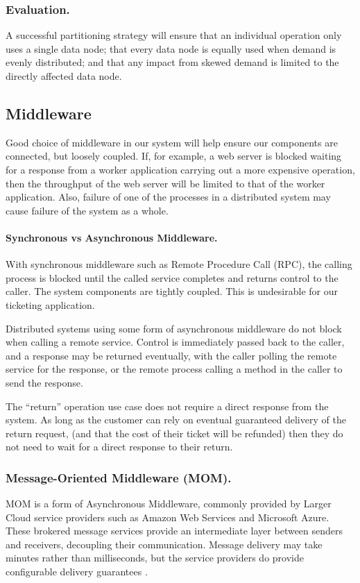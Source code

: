 \documentclass{llncs}
\begin{document}
\subsubsection{Evaluation.}

A successful partitioning strategy will ensure that an individual operation only uses a single data node; that every data node is equally used when demand is evenly distributed; and that any impact from skewed demand is limited to the directly affected data node.

\subsection{Middleware}

Good choice of middleware in our system will help ensure our components are connected, but loosely coupled.  If, for example, a web server is blocked waiting for a response from a worker application carrying out a more expensive operation, then the throughput of the web server will be limited to that of the worker application.  Also, failure of one of the processes in a distributed system may cause failure of the system as a whole.

\paragraph{Synchronous vs Asynchronous Middleware.}
With synchronous middleware such as Remote Procedure Call (RPC), the calling process is blocked until the called service completes and returns control to the caller.  The system components are tightly coupled.  This is undesirable for our ticketing application.

Distributed systems using some form of asynchronous middleware do not block when calling a remote service.  Control is immediately passed back to the caller, and a response may be returned eventually, with the caller polling the remote service for the response, or the remote process calling a method in the caller to send the response.

The ``return'' operation use case does not require a direct response from the system.  As long as the customer can rely on eventual guaranteed delivery of the return request, (and that the cost of their ticket will be refunded) then they do not need to wait for a direct response to their return.

\subsubsection{Message-Oriented Middleware (MOM).}  MOM is a form of Asynchronous Middleware, commonly provided by Larger Cloud service providers such as Amazon Web Services and Microsoft Azure.  These brokered message services provide an intermediate layer between senders and receivers, decoupling their communication.  Message delivery may take minutes rather than milliseconds, but the service providers do provide configurable delivery guarantees \cite{curry2004message}.
\end{document}
